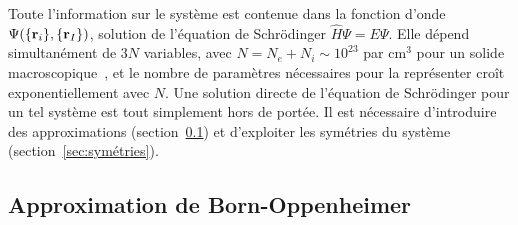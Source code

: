 Toute l'information sur le système est contenue dans la fonction d'onde $\Psi(\{\mathbf{r}_i\}, \{\mathbf{r}_I\})$, solution de l'équation de Schrödinger $\hat{H}\Psi=E\Psi$. Elle dépend simultanément de $3N$ variables, avec $N=N_e+N_i \sim 10^{23}$ par cm$^{3}$ pour un solide macroscopique~\cite{alloulIntroductionPhysicsElectrons2011a}, et le nombre de paramètres nécessaires pour la représenter croît exponentiellement avec $N$. Une solution directe de l'équation de Schrödinger pour un tel système est tout simplement hors de portée. Il est nécessaire d'introduire des approximations (section~\ref{sec:BO}) et d'exploiter les symétries du système (section~\ref{sec:symétries}).

\subsection{Approximation de Born-Oppenheimer}\label{sec:BO}

